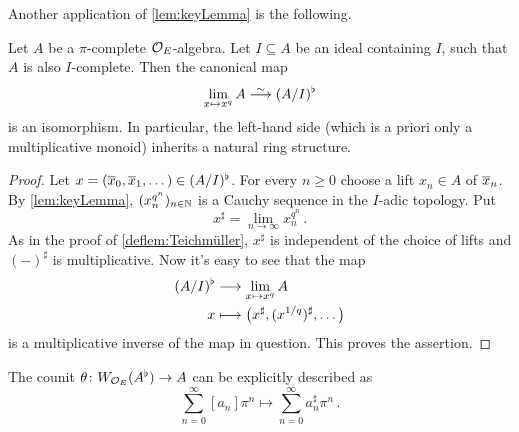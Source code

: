 \documentclass[a4paper, 10pt, oneside, DIV=9, chapterprefix=true, numbers=enddot,bibliography=totoc]{scrbook}
\begin{document}
Another application of \cref{lem:keyLemma} is the following.
\begin{prop}\label{prop:(A/I)b}
	Let $A$ be a $\pi$-complete $\mathcal{O}_E$-algebra. Let $I\subseteq A$ be an ideal containing $I$, such that $A$ is also $I$-complete. Then the canonical map
	\begin{equation*}
		\lim_{x\mapsto x^q}A\isomorphism (A/I)^\flat
	\end{equation*}
	is an isomorphism. In particular, the left-hand side (which is a priori only a multiplicative monoid) inherits a natural ring structure.
\end{prop}
\begin{proof}
	Let $x=(\ov{x}_0,\ov{x}_1,\dotsc)\in (A/I)^\flat$. For every $n\geq 0$ choose a lift $x_n\in A$ of $\ov{x}_n$. By \cref{lem:keyLemma}, $(x_n^{q^n})_{n\in\mathbb{N}}$ is a Cauchy sequence in the $I$-adic topology. Put
	\begin{equation*}
		x^\sharp=\lim_{n\to\infty}x_n^{q^n}\,.
	\end{equation*}
	As in the proof of \cref{deflem:Teichmüller}, $x^\sharp$ is independent of the choice of lifts and $(-)^\sharp$ is multiplicative. Now it's easy to see that the map
	\begin{align*}
		(A/I)^\flat&\morphism \lim_{x\mapsto x^q}A\\
		x&\longmapsto \big(x^\sharp,(x^{1/q})^\sharp,\dotsc\big)
	\end{align*}
	is a multiplicative inverse of the map in question. This proves the assertion.
\end{proof}
\begin{lem}\label{lem:WAb->A}
	The counit $\theta\colon W_{\Oo_E}(A^\flat)\morphism A$ can be explicitly described as 
	\begin{equation*}
		\sum_{n=0}^\infty[a_n]\pi^n\longmapsto \sum_{n=0}^\infty a_n^\sharp \pi^n\,.
	\end{equation*}
\end{lem}
\end{document}
